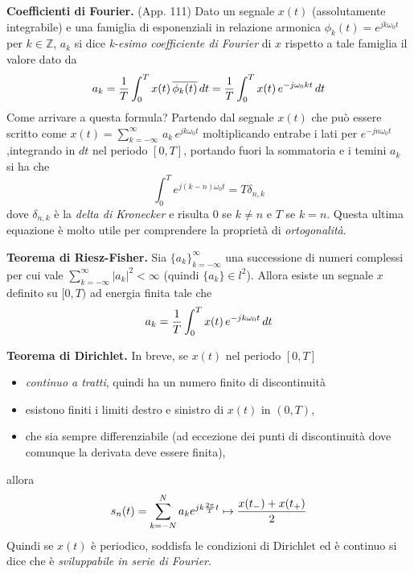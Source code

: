 \documentclass[a4paper,portrait,12pt]{article}
\theoremstyle{definition}
\begin{document}
\textbf{Coefficienti di Fourier.} (App. 111) Dato un segnale $x(t)$ (assolutamente integrabile) e una 
famiglia di esponenziali in relazione armonica $\phi_k(t) = e^{jk\omega_0t}$ per $k\in\mathbb{Z}$, $a_k$ si 
dice \textit{k-esimo coefficiente di Fourier} di $x$ rispetto a tale famiglia il valore dato da
\begin{equation}
a_k = {1 \over T}\int_0^Tx(t)\,\overline{\phi_k(t)}\,dt = {1 \over T}\int_0^Tx(t)\,e^{-j\omega_0kt}\,dt
\end{equation}
Come arrivare a questa formula? Partendo dal segnale $x(t)$ che può essere scritto come
$x(t) = \sum_{k=-\infty}^{\infty}\,a_k\,e^{jk\omega_0t}$
moltiplicando entrabe i lati per $e^{-jn\omega_0t}$,integrando in $dt$ nel periodo $[0,T]$, portando fuori 
la sommatoria e i temini $a_k$ si ha che
\begin{equation}
\int_0^Te^{j(k-n)\omega_0t} = T \delta_{n,k} 
\end{equation}
dove $\delta_{n,k}$ è la \textit{delta di Kronecker} e risulta $0$ se $k\neq n$ e $T$ se $k = n$. Questa
ultima equazione è molto utile per comprendere la proprietà di \textit{ortogonalità}.
\bigskip

\textbf{Teorema di Riesz-Fisher.} Sia $\{a_k\}_{k=-\infty}^{\infty}$ una successione di numeri 
complessi per cui vale $\sum_{k=-\infty}^{\infty}\left|a_k\right|^2 < \infty$ (quindi $\{a_k\} \in l^2$). 
Allora esiste un segnale $x$ definito su $[0,T)$ ad energia finita tale che
\begin{equation}
a_k = {1 \over T}\int_0^Tx(t)\,e^{-jk\omega_0t}\,dt
\end{equation}
\bigskip

\textbf{Teorema di Dirichlet.} In breve, se $x(t)$ nel periodo $[0,T]$ 
\begin{itemize}
\item \textit{continuo a tratti}, quindi ha un numero finito di discontinuità
\item esistono finiti i limiti destro e sinistro di $x(t)$ in $(0,T)$,
\item che sia sempre differenziabile (ad eccezione dei punti di discontinuità dove comunque la derivata deve
	essere finita),
\end{itemize}
allora
\begin{equation}
s_n (t) = \sum_{k=-N}^N a_k e^{jk{2 \pi \over T}t} \mapsto {x(t_-) + x(t_+) \over 2}
\end{equation}
Quindi se $x(t)$ è periodico, soddisfa le condizioni di Dirichlet ed è continuo si dice che è 
\textit{sviluppabile in serie di Fourier}.
\bigskip
\end{document}
